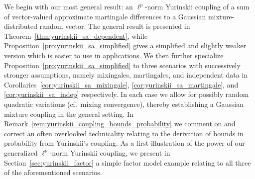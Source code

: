 We begin with our most general result: an $\ell^p$-norm Yurinskii coupling of a
sum of vector-valued approximate martingale differences to a Gaussian
mixture-distributed random vector. The general result is presented in
Theorem~\ref{thm:yurinskii_sa_dependent}, while
Proposition~\ref{pro:yurinskii_sa_simplified} gives
a simplified and slightly weaker version which is easier to use in
applications. We then further specialize
Proposition~\ref{pro:yurinskii_sa_simplified} to
three scenarios with successively stronger assumptions, namely mixingales,
martingales, and independent data in
Corollaries~\ref{cor:yurinskii_sa_mixingale},
\ref{cor:yurinskii_sa_martingale}, and \ref{cor:yurinskii_sa_indep}
respectively. In each case we
allow for possibly random quadratic variations (cf.\ mixing convergence),
thereby establishing a Gaussian mixture coupling in the general setting. In
Remark~\ref{rem:yurinskii_coupling_bounds_probability} we comment on and
correct an often
overlooked technicality relating to the derivation of bounds in probability
from Yurinskii's coupling. As a first illustration of the power of our
generalized $\ell^p$-norm Yurinskii coupling, we present in
Section~\ref{sec:yurinskii_factor} a simple factor model example relating to
all three of the aforementioned scenarios.

